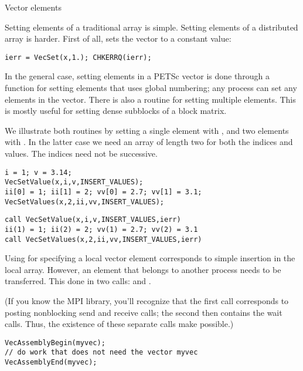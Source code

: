  {Vector elements}

Setting elements of a traditional array is simple. Setting elements of
a distributed array is harder.
First of all,  sets the vector to a constant value:
\begin{lstlisting}
ierr = VecSet(x,1.); CHKERRQ(ierr);  
\end{lstlisting}

In the general case, setting elements in a PETSc vector is done
through a
function  for setting elements that uses global numbering; any
process can set any elements in the vector.
%
There is also a routine  for setting
multiple elements. This is mostly useful for setting dense subblocks
of a block matrix.

We illustrate both routines by setting a single element with ,
and two elements with . In the latter case
we need an array of length two for both the indices and values. The indices need
not be successive.

\lstset{language=C}
\begin{lstlisting}
i = 1; v = 3.14;
VecSetValue(x,i,v,INSERT_VALUES);
ii[0] = 1; ii[1] = 2; vv[0] = 2.7; vv[1] = 3.1;
VecSetValues(x,2,ii,vv,INSERT_VALUES);
\end{lstlisting}

\lstset{language=Fortran}
\begin{lstlisting}
call VecSetValue(x,i,v,INSERT_VALUES,ierr)
ii(1) = 1; ii(2) = 2; vv(1) = 2.7; vv(2) = 3.1
call VecSetValues(x,2,ii,vv,INSERT_VALUES,ierr)
\end{lstlisting}
\lstset{language=C}

Using  for specifying a local vector element
corresponds to simple insertion in the local array. However,
an element that belongs to another process needs to be
transferred. This done in two calls: 
and .


(If you know the MPI library, you'll recognize that the first call corresponds to
posting nonblocking send and receive calls; the second then contains
the wait calls. Thus, the existence of these separate calls make
 possible.)

\begin{lstlisting}
VecAssemblyBegin(myvec);
// do work that does not need the vector myvec
VecAssemblyEnd(myvec);
\end{lstlisting}

